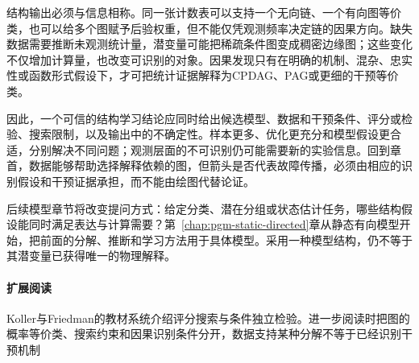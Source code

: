 结构输出必须与信息相称。同一张计数表可以支持一个无向链、一个有向图等价类，也可以给多个图赋予后验权重，但不能仅凭观测频率决定链的因果方向。缺失数据需要推断未观测统计量，潜变量可能把稀疏条件图变成稠密边缘图；这些变化不仅增加计算量，也改变可识别的对象。因果发现只有在明确的机制、混杂、忠实性或函数形式假设下，才可把统计证据解释为CPDAG、PAG或更细的干预等价类。

因此，一个可信的结构学习结论应同时给出候选模型、数据和干预条件、评分或检验、搜索限制，以及输出中的不确定性。样本更多、优化更充分和模型假设更合适，分别解决不同问题；观测层面的不可识别仍可能需要新的实验信息。回到章首，数据能够帮助选择解释依赖的图，但箭头是否代表故障传播，必须由相应的识别假设和干预证据承担，而不能由绘图代替论证。

后续模型章节将改变提问方式：给定分类、潜在分组或状态估计任务，哪些结构假设能同时满足表达与计算需要？第~\ref{chap:pgm-static-directed}章从静态有向模型开始，把前面的分解、推断和学习方法用于具体模型。采用一种模型结构，仍不等于其潜变量已获得唯一的物理解释。

\paragraph{扩展阅读}
Koller与Friedman的教材系统介绍评分搜索与条件独立检验。进一步阅读时把图的概率等价类、搜索约束和因果识别条件分开，数据支持某种分解不等于已经识别干预机制
